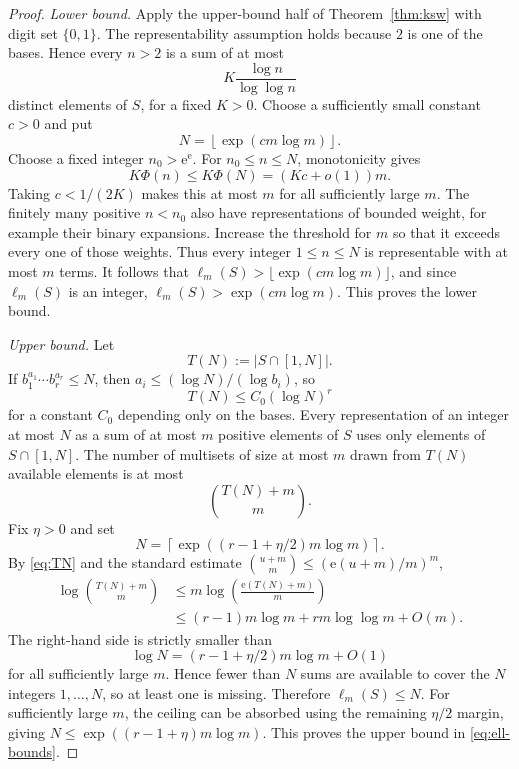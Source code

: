 \documentclass[11pt]{article}
\newcommand{\ee}{\mathrm{e}}
\newcommand{\scale}{\Phi}
\begin{document}
\begin{proof}
\emph{Lower bound.}
Apply the upper-bound half of Theorem~\ref{thm:ksw} with digit set $\{0,1\}$.  The representability assumption holds because $2$ is one of the bases.  Hence every $n>2$ is a sum of at most
\[
K\frac{\log n}{\log\log n}
\]
distinct elements of $S$, for a fixed $K>0$.  Choose a sufficiently small constant $c>0$ and put
\[
N=\left\lfloor\exp(c m\log m)\right\rfloor.
\]
Choose a fixed integer $n_0>\ee^{\ee}$. For $n_0\le n\le N$,
monotonicity gives
\[
K\scale(n)\le K\scale(N)=(Kc+o(1))m.
\]
Taking $c<1/(2K)$ makes this at most $m$ for all sufficiently large $m$.
The finitely many positive $n<n_0$ also have representations of bounded
weight, for example their binary expansions. Increase the threshold for
$m$ so that it exceeds every one of those weights. Thus every integer
$1\le n\le N$ is representable with at most $m$ terms. It follows that
$\ell_m(S)>\lfloor\exp(cm\log m)\rfloor$, and since $\ell_m(S)$ is an
integer, $\ell_m(S)>\exp(cm\log m)$. This proves the lower bound.

\smallskip
\noindent\emph{Upper bound.}
Let
\[
T(N):=|S\cap[1,N]|.
\]
If $b_1^{a_1}\cdots b_r^{a_r}\le N$, then
$a_i\le(\log N)/(\log b_i)$, so
\begin{equation}\label{eq:TN}
T(N)\le C_0(\log N)^r
\end{equation}
for a constant $C_0$ depending only on the bases.  Every representation of an integer at most $N$ as a sum of at most $m$ positive elements of $S$ uses only elements of $S\cap[1,N]$.  The number of multisets of size at most $m$ drawn from $T(N)$ available elements is at most
\[
\binom{T(N)+m}{m}.
\]
Fix $\eta>0$ and set
\[
N=\left\lceil\exp((r-1+\eta/2)m\log m)\right\rceil.
\]
By \eqref{eq:TN} and the standard estimate
$\binom{u+m}{m}\le (\ee(u+m)/m)^m$,
\begin{align*}
\log\binom{T(N)+m}{m}
&\le m\log\!\left(\frac{\ee(T(N)+m)}{m}\right)\\
&\le (r-1)m\log m+r m\log\log m+O(m).
\end{align*}
The right-hand side is strictly smaller than
\[
\log N=(r-1+\eta/2)m\log m+O(1)
\]
for all sufficiently large $m$.  Hence fewer than $N$ sums are available to cover the $N$ integers $1,\ldots,N$, so at least one is missing.  Therefore $\ell_m(S)\le N$. For sufficiently large $m$, the ceiling can be absorbed using the remaining $\eta/2$ margin, giving $N\le\exp((r-1+\eta)m\log m)$. This proves the upper bound in \eqref{eq:ell-bounds}.
\end{proof}
\end{document}
